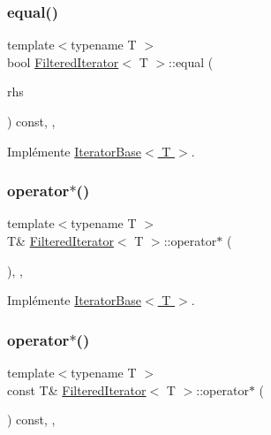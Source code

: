 \subsubsection{\texorpdfstring{equal()}{equal()}}
{\footnotesize\ttfamily template$<$typename T $>$ \\
bool \hyperlink{class_filtered_iterator}{Filtered\+Iterator}$<$ T $>$\+::equal (\begin{DoxyParamCaption}\item[{const \hyperlink{class_iterator_base}{Iterator\+Base}$<$ T $>$ \&}]{rhs }\end{DoxyParamCaption}) const\hspace{0.3cm}{\ttfamily [inline]}, {\ttfamily [override]}, {\ttfamily [virtual]}}



Implémente \hyperlink{class_iterator_base_a08430515a17384d098eb62ecce1b64c6}{Iterator\+Base$<$ T $>$}.

\mbox{\label{class_filtered_iterator_ac891b168cd653612ddc7ed7cb4380196}} 
\subsubsection{\texorpdfstring{operator$\ast$()}{operator*()}\hspace{0.1cm}{\footnotesize\ttfamily [1/2]}}
{\footnotesize\ttfamily template$<$typename T $>$ \\
T\& \hyperlink{class_filtered_iterator}{Filtered\+Iterator}$<$ T $>$\+::operator$\ast$ (\begin{DoxyParamCaption}{ }\end{DoxyParamCaption})\hspace{0.3cm}{\ttfamily [inline]}, {\ttfamily [override]}, {\ttfamily [virtual]}}



Implémente \hyperlink{class_iterator_base_a532583e58bce168648bdbdedb3a7d5ab}{Iterator\+Base$<$ T $>$}.

\mbox{\label{class_filtered_iterator_aab76ce411b72c85c3e6a9007a6c9fd98}} 
\subsubsection{\texorpdfstring{operator$\ast$()}{operator*()}\hspace{0.1cm}{\footnotesize\ttfamily [2/2]}}
{\footnotesize\ttfamily template$<$typename T $>$ \\
const T\& \hyperlink{class_filtered_iterator}{Filtered\+Iterator}$<$ T $>$\+::operator$\ast$ (\begin{DoxyParamCaption}{ }\end{DoxyParamCaption}) const\hspace{0.3cm}{\ttfamily [inline]}, {\ttfamily [override]}, {\ttfamily [virtual]}}



